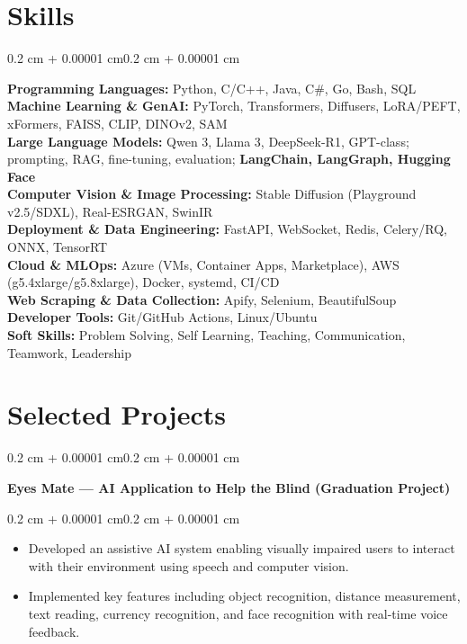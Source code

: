 \documentclass[10pt, letterpaper]{article}
\newenvironment{highlights}{
  \begin{itemize}[
    topsep=0.10 cm,
    parsep=0.10 cm,
    partopsep=0pt,
    itemsep=0pt,
    leftmargin=0.4 cm + 10pt
  ]}
  {\end{itemize}
}
\newenvironment{onecolentry}{
  \begin{adjustwidth}{0.2 cm + 0.00001 cm}{0.2 cm + 0.00001 cm}
}{
  \end{adjustwidth}
}
\newenvironment{twocolentry}[2][]{
  \onecolentry
  \def\secondColumn{#2}
  \setcolumnwidth{\fill, 4.5 cm}
  \begin{paracol}{2}
}{
  \switchcolumn \raggedleft \secondColumn
  \end{paracol}
  \endonecolentry
}
\let\hrefWithoutArrow\href
\renewcommand{\href}[2]{\hrefWithoutArrow{#1}{\ifthenelse{\equal{#2}{}}{ }{#2 }\raisebox{.15ex}{\footnotesize \faExternalLink*}}}
\begin{document}
\section{Skills}
\begin{onecolentry}
  \textbf{Programming Languages:} Python, C/C++, Java, C\#, Go, Bash, SQL \\[4pt]
  \textbf{Machine Learning \& GenAI:} PyTorch, Transformers, Diffusers, LoRA/PEFT, xFormers, FAISS, CLIP, DINOv2, SAM \\[4pt]
  \textbf{Large Language Models:} Qwen 3, Llama 3, DeepSeek-R1, GPT-class; prompting, RAG, fine-tuning, evaluation; \textbf{LangChain, LangGraph, Hugging Face} \\[4pt]
  \textbf{Computer Vision \& Image Processing:} Stable Diffusion (Playground v2.5/SDXL), Real-ESRGAN, SwinIR \\[4pt]
  \textbf{Deployment \& Data Engineering:} FastAPI, WebSocket, Redis, Celery/RQ, ONNX, TensorRT \\[4pt]
  \textbf{Cloud \& MLOps:} Azure (VMs, Container Apps, Marketplace), AWS (g5.4xlarge/g5.8xlarge), Docker, systemd, CI/CD \\[4pt]
  \textbf{Web Scraping \& Data Collection:} Apify, Selenium, BeautifulSoup \\[4pt]
  \textbf{Developer Tools:} Git/GitHub Actions, Linux/Ubuntu \\[4pt]
  \textbf{Soft Skills:} Problem Solving, Self Learning, Teaching, Communication, Teamwork, Leadership
\end{onecolentry}

\section{Selected Projects}

\begin{twocolentry}{
  \textit{\href{https://github.com/Islam-hady9/application-to-help-the-blind-eyes-mate}{GitHub Link}}}
  \textbf{Eyes Mate — AI Application to Help the Blind (Graduation Project)}
\end{twocolentry}
\vspace{0.10 cm}
\begin{onecolentry}
  \begin{highlights}
    \item Developed an assistive AI system enabling visually impaired users to interact with their environment using speech and computer vision.
    \item Implemented key features including object recognition, distance measurement, text reading, currency recognition, and face recognition with real-time voice feedback.
  \end{highlights}
\end{onecolentry}
\end{document}
